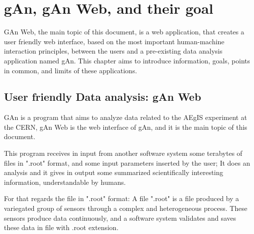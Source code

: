 
\chapter{gAn, gAn Web, and their goal} %

\label{Chapter2} %


GAn Web, the main topic of this document, is a web application, that creates a user friendly web interface, based on the most important human-machine interaction principles, between the users and a pre-existing data analysis application named gAn. This chapter aims to introduce information, goals, points in common, and limits of these applications.

\section{User friendly Data analysis: gAn Web}

GAn is a program that aims to analyze data related to the AEgIS experiment at the CERN, gAn Web is the web interface of gAn, and it is the main topic of this document.
 
This program receives in input from another software system some terabytes of files in ".root" format, and some input parameters inserted by the user;
It does an analysis and it gives in output some summarized scientifically interesting information, understandable by humans.   

For that regards the file in ".root" format:
A file ".root" is a file produced by a variegated group of sensors through a complex and heterogeneous process. These sensors produce data continuously, and a software system validates and saves these data in file with .root extension. 

